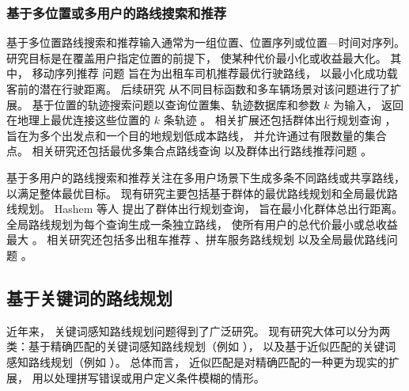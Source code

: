 \subsubsection*{基于多位置或多用户的路线搜索和推荐}

基于多位置路线搜索和推荐输入通常为一组位置、位置序列或位置—时间对序列。 研究目标是在覆盖用户指定位置的前提下， 使某种代价最小化或收益最大化。 其中， 移动序列推荐
问题  旨在为出租车司机推荐最优行驶路线， 以最小化成功载客前的潜在行驶距离。 后续研究  从不同目标函数和多车辆场景对该问题进行了扩展。 基于位置的轨迹搜索问题以查询位置集、轨迹数据库和参数 $k$ 为输入， 返回在地理上最优连接这些位置的 $k$ 条轨迹 。 相关扩展还包括群体出行规划查询 ， 旨在为多个出发点和一个目的地规划低成本路线， 并允许通过有限数量的集合点。 相关研究还包括最优多集合点路线查询 以及群体出行路线推荐问题 。

基于多用户的路线搜索和推荐关注在多用户场景下生成多条不同路线或共享路线， 以满足整体最优目标。 现有研究主要包括基于群体的最优路线规划和全局最优路线规划。 Hashem 等人  提出了群体出行规划查询， 旨在最小化群体总出行距离。 全局路线规划为每个查询生成一条独立路线， 使所有用户的总代价最小或总收益最大 。 相关研究还包括多出租车推荐 、拼车服务路线规划  以及全局最优路线问题 。


\subsection{基于关键词的路线规划}
\label{sec:keyword}
近年来， 关键词感知路线规划问题得到了广泛研究。 现有研究大体可以分为两类：基于精确匹配的关键词感知路线规划（例如 ）， 以及基于近似匹配的关键词感知路线规划（例如 ）。 总体而言， 近似匹配是对精确匹配的一种更为现实的扩展， 用以处理拼写错误或用户定义条件模糊的情形。


